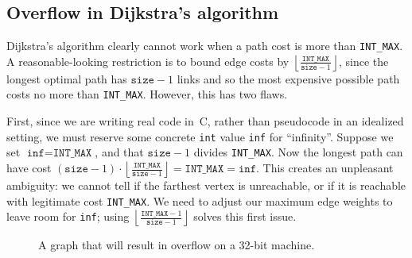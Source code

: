 \subsection{Overflow in Dijkstra's algorithm}
\label{sec:dijkoverflow}

Dijkstra's algorithm clearly cannot work when a path
cost is more than \texttt{INT\_MAX}.  A reasonable-looking restriction
is to bound edge costs by
$\left\lfloor\frac{\texttt{INT\_MAX}}{\texttt{size}-1}\right\rfloor$, since
the longest optimal path has $\texttt{size}-1$ links and so the
most expensive possible path costs no more than \texttt{INT\_MAX}.
However, this has two flaws.

First, since we are writing real code in~C,
rather than pseudocode in an idealized setting, we must reserve some
concrete \texttt{int} value \texttt{inf} for ``infinity''.  Suppose we 
set $\texttt{inf}=\texttt{INT\_MAX}$, and that $\texttt{size}-1$ divides \texttt{INT\_MAX}.  Now the longest path can have cost $(\texttt{size}-1)\cdot\left\lfloor\frac{\texttt{INT\_MAX}}{\texttt{size}-1}\right\rfloor = \texttt{INT\_MAX} = \texttt{inf}$.  This creates an unpleasant ambiguity: we cannot tell if the farthest vertex is unreachable, or if it is reachable with legitimate cost \texttt{INT\_MAX}.  We need to adjust our maximum edge weights to leave room for \texttt{inf}; using $\left\lfloor\frac{\texttt{INT\_MAX}-1}{\texttt{size}-1}\right\rfloor$ solves this first issue.


\begin{figure}[t]
\centering
{}
\vspace*{-1.25em}
\caption{A graph that will result in overflow on a 32-bit machine.}
\label{fig:overflow}
\vspace*{-1.75em}
\end{figure}

